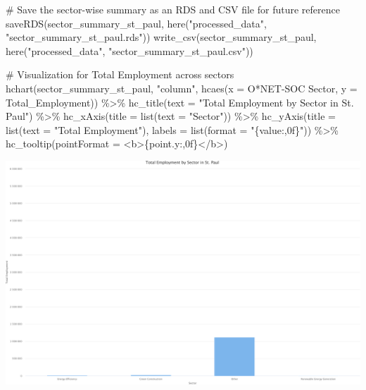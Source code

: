 \documentclass[
  letterpaper,
  DIV=11,
  numbers=noendperiod]{scrartcl}
\newenvironment{Shaded}{\begin{snugshade}}{\end{snugshade}}
\newcommand{\AttributeTok}[1]{\textcolor[rgb]{0.40,0.45,0.13}{#1}}
\newcommand{\CommentTok}[1]{\textcolor[rgb]{0.37,0.37,0.37}{#1}}
\newcommand{\FunctionTok}[1]{\textcolor[rgb]{0.28,0.35,0.67}{#1}}
\newcommand{\NormalTok}[1]{\textcolor[rgb]{0.00,0.23,0.31}{#1}}
\newcommand{\SpecialCharTok}[1]{\textcolor[rgb]{0.37,0.37,0.37}{#1}}
\newcommand{\StringTok}[1]{\textcolor[rgb]{0.13,0.47,0.30}{#1}}
\begin{document}
\begin{Shaded}
\begin{Highlighting}[]
\CommentTok{\# Save the sector{-}wise summary as an RDS and CSV file for future reference}
\FunctionTok{saveRDS}\NormalTok{(sector\_summary\_st\_paul, }\FunctionTok{here}\NormalTok{(}\StringTok{"processed\_data"}\NormalTok{, }\StringTok{"sector\_summary\_st\_paul.rds"}\NormalTok{))}
\FunctionTok{write\_csv}\NormalTok{(sector\_summary\_st\_paul, }\FunctionTok{here}\NormalTok{(}\StringTok{"processed\_data"}\NormalTok{, }\StringTok{"sector\_summary\_st\_paul.csv"}\NormalTok{))}

\CommentTok{\# Visualization for Total Employment across sectors}
\FunctionTok{hchart}\NormalTok{(sector\_summary\_st\_paul, }\StringTok{"column"}\NormalTok{, }\FunctionTok{hcaes}\NormalTok{(}\AttributeTok{x =} \StringTok{\textasciigrave{}}\AttributeTok{O*NET{-}SOC Sector}\StringTok{\textasciigrave{}}\NormalTok{, }\AttributeTok{y =}\NormalTok{ Total\_Employment)) }\SpecialCharTok{\%\textgreater{}\%}
  \FunctionTok{hc\_title}\NormalTok{(}\AttributeTok{text =} \StringTok{"Total Employment by Sector in St. Paul"}\NormalTok{) }\SpecialCharTok{\%\textgreater{}\%}
  \FunctionTok{hc\_xAxis}\NormalTok{(}\AttributeTok{title =} \FunctionTok{list}\NormalTok{(}\AttributeTok{text =} \StringTok{"Sector"}\NormalTok{)) }\SpecialCharTok{\%\textgreater{}\%}
  \FunctionTok{hc\_yAxis}\NormalTok{(}\AttributeTok{title =} \FunctionTok{list}\NormalTok{(}\AttributeTok{text =} \StringTok{"Total Employment"}\NormalTok{), }\AttributeTok{labels =} \FunctionTok{list}\NormalTok{(}\AttributeTok{format =} \StringTok{"\{value:,0f\}"}\NormalTok{)) }\SpecialCharTok{\%\textgreater{}\%}
  \FunctionTok{hc\_tooltip}\NormalTok{(}\AttributeTok{pointFormat =} \StringTok{\textquotesingle{}\textless{}b\textgreater{}\{point.y:,0f\}\textless{}/b\textgreater{}\textquotesingle{}}\NormalTok{)}
\end{Highlighting}
\end{Shaded}

\includegraphics{index_files/figure-pdf/unnamed-chunk-36-1.pdf}
\end{document}
